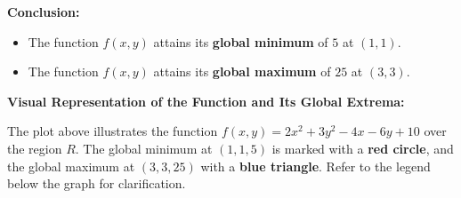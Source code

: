 \begin{example}
\begin{solution}
        \noindent \textbf{Conclusion:}
        \begin{itemize}
            \item The function \( f(x,y) \) attains its \textbf{global minimum} of \( 5 \) at \( (1, 1) \).
            \item The function \( f(x,y) \) attains its \textbf{global maximum} of \( 25 \) at \( (3, 3) \).
        \end{itemize}
        
        \item \textbf{Visual Representation of the Function and Its Global Extrema:}
        
\begin{center}
\end{center}

\noindent The plot above illustrates the function \( f(x,y) = 2x^2 + 3y^2 - 4x - 6y + 10 \) over the region \( R \). The global minimum at \( (1, 1, 5) \) is marked with a \textbf{red circle}, and the global maximum at \( (3, 3, 25) \) with a \textbf{blue triangle}. Refer to the legend below the graph for clarification.
    \end{solution}
\end{example}
\exampleline

